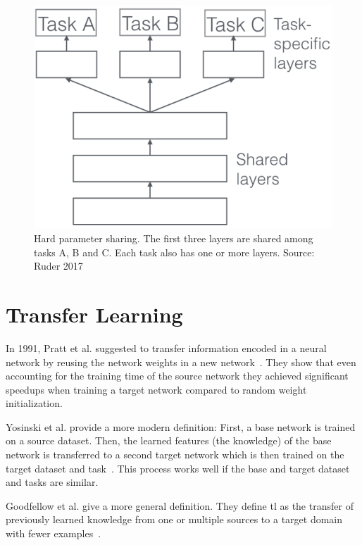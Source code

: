 \begin{figure}[ht]
    \centering
    \includegraphics[scale=0.5]{figures/03_theory/03_mtl_architecture}
    \caption{Hard parameter sharing. The first three layers are shared among tasks A, B and C. Each task also has one or more layers. Source: Ruder 2017~\cite{Ruder2017}}
    \label{fig:03_mtl_architecture}
\end{figure}



\section{Transfer Learning}
\label{sec:TransferLearning}

In 1991, Pratt et al. suggested to transfer information encoded in a neural network by reusing the network weights in a new network~\cite{Pratt1991}. They show that even accounting for the training time of the source network they achieved significant speedups when training a target network compared to random weight initialization.

Yosinski et al. provide a more modern definition: First, a base network is trained on a source dataset. Then, the learned features {(the knowledge)} of the base network is transferred to a second target network which is then trained on the target dataset and task~\cite{Yosinski2014}. This process works well if the base and target dataset and tasks are similar.

Goodfellow et al. give a more general definition. They define \gls{tl} as the transfer of previously learned knowledge from one or multiple sources to a target domain with fewer examples~\cite{Goodfellow2016}.

